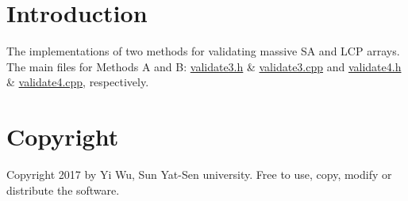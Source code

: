 \hypertarget{index_intro_sec}{}\section{Introduction}\label{index_intro_sec}
The implementations of two methods for validating massive SA and L\+CP arrays. The main files for Methods A and B\+: \hyperlink{validate3_8h}{validate3.\+h} \& \hyperlink{validate3_8cpp}{validate3.\+cpp} and \hyperlink{validate4_8h}{validate4.\+h} \& \hyperlink{validate4_8cpp}{validate4.\+cpp}, respectively.\hypertarget{index_copyright_sec}{}\section{Copyright}\label{index_copyright_sec}
Copyright 2017 by Yi Wu, Sun Yat-\/\+Sen university. Free to use, copy, modify or distribute the software. 
